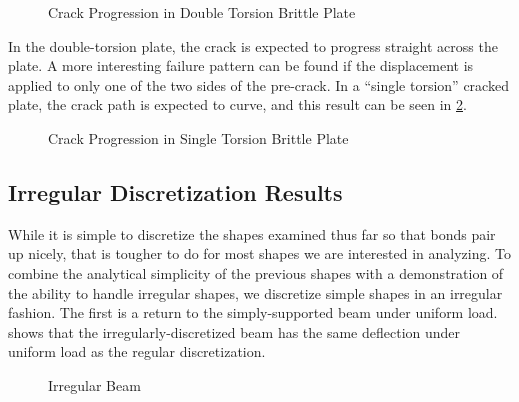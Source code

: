 %
\begin{figure}[tbhp]
  \centering
  \resizebox{0.6\linewidth}{!}{}
  \caption{Crack Progression in Double Torsion Brittle Plate}
  \label{fig:DTdamage}
\end{figure}
%
In the double-torsion plate, the crack is expected to progress straight across the plate.
A more interesting failure pattern can be found if the displacement is applied to only one of the two sides of the pre-crack.
In a ``single torsion'' cracked plate, the crack path is expected to curve, and this result can be seen in \cref{fig:SingleTorsion}. 
%
\begin{figure}[tbhp]
  \centering
  \resizebox{0.6\linewidth}{!}{}
  \caption{Crack Progression in Single Torsion Brittle Plate}
  \label{fig:SingleTorsion}
\end{figure}
%

\FloatBarrier
\subsection{Irregular Discretization Results}
While it is simple to discretize the shapes examined thus far so that bonds pair up nicely, that is tougher to do for most shapes we are interested in analyzing.
To combine the analytical simplicity of the previous shapes with a demonstration of the ability to handle irregular shapes, we discretize simple shapes in an irregular fashion.
The first is a return to the simply-supported beam under uniform load.
 shows that the irregularly-discretized beam has the same deflection under uniform load as the regular discretization. 
%
\begin{figure}[tbhp]
  \centering
  \resizebox{0.6\linewidth}{!}{}
  \caption{Irregular Beam}
  \label{fig:BeamIrreg}
\end{figure}
%

